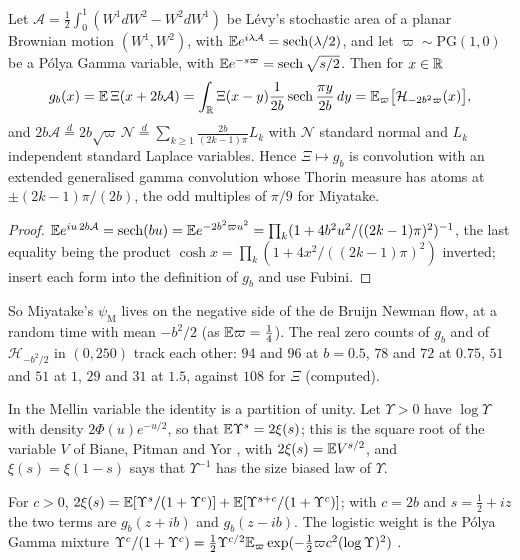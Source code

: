 \begin{theorem}\label{mi:thm:levyarea}
Let $\mathcal A=\frac12\int_0^1(W^1dW^2-W^2dW^1)$ be L\'evy's stochastic area of a planar Brownian motion $(W^1,W^2)$, with $\mathbb{E} e^{i\lambda\mathcal A}=\operatorname{sech}(\lambda/2)$, and let $\varpi\sim\mathrm{PG}(1,0)$ be a P\'olya Gamma variable, with $\mathbb{E} e^{-s\varpi}=\operatorname{sech}\sqrt{s/2}$. Then for $x\in\mathbb{R}$
\[
g_b(x)=\mathbb{E}\,\Xi(x+2b\mathcal A)=\int_{\mathbb{R}}\Xi(x-y)\frac1{2b}\operatorname{sech}\frac{\pi y}{2b}\,dy=\mathbb{E}_\varpi\big[\mathcal H_{-2b^2\varpi}(x)\big],
\]
and $2b\mathcal A\overset d=2b\sqrt\varpi\,\mathcal N\overset d=\sum_{k\ge1}\frac{2b}{(2k-1)\pi}L_k$ with $\mathcal N$ standard normal and $L_k$ independent standard Laplace variables. Hence $\Xi\mapsto g_b$ is convolution with an extended generalised gamma convolution whose Thorin measure has atoms at $\pm(2k-1)\pi/(2b)$, the odd multiples of $\pi/9$ for Miyatake.
\end{theorem}

\begin{proof}
$\mathbb{E} e^{iu\,2b\mathcal A}=\operatorname{sech}(bu)=\mathbb{E} e^{-2b^2\varpi u^2}=\prod_k(1+4b^2u^2/((2k-1)\pi)^2)^{-1}$, the last equality being the product $\cosh x=\prod_k(1+4x^2/((2k-1)\pi)^2)$ inverted; insert each form into the definition of $g_b$ and use Fubini.
\end{proof}

So Miyatake's $\psi_{\mathrm M}$ lives on the negative side of the de Bruijn Newman flow, at a random time with mean $-b^2/2$ (as $\mathbb{E}\varpi=\frac14$). The real zero counts of $g_b$ and of $\mathcal H_{-b^2/2}$ in $(0,250)$ track each other: $94$ and $96$ at $b=0.5$, $78$ and $72$ at $0.75$, $51$ and $51$ at $1$, $29$ and $31$ at $1.5$, against $108$ for $\Xi$ (computed).

In the Mellin variable the identity is a partition of unity. Let $\Upsilon>0$ have $\log\Upsilon$ with density $2\Phi(u)e^{-u/2}$, so that $\mathbb{E}\Upsilon^s=2\xi(s)$; this is the square root of the variable $V$ of Biane, Pitman and Yor \cite{BPY01}, with $2\xi(s)=\mathbb{E} V^{s/2}$, and $\xi(s)=\xi(1-s)$ says that $\Upsilon^{-1}$ has the size biased law of $\Upsilon$.

\begin{proposition}\label{mi:prop:logistic}
For $c>0$, $2\xi(s)=\mathbb{E}[\Upsilon^s/(1+\Upsilon^c)]+\mathbb{E}[\Upsilon^{s+c}/(1+\Upsilon^c)]$; with $c=2b$ and $s=\frac12+iz$ the two terms are $g_b(z+ib)$ and $g_b(z-ib)$. The logistic weight is the P\'olya Gamma mixture $\Upsilon^c/(1+\Upsilon^c)=\frac12\Upsilon^{c/2}\mathbb{E}_\varpi\exp(-\frac12\varpi c^2(\log\Upsilon)^2)$ \cite{PSW13}.
\end{proposition}

